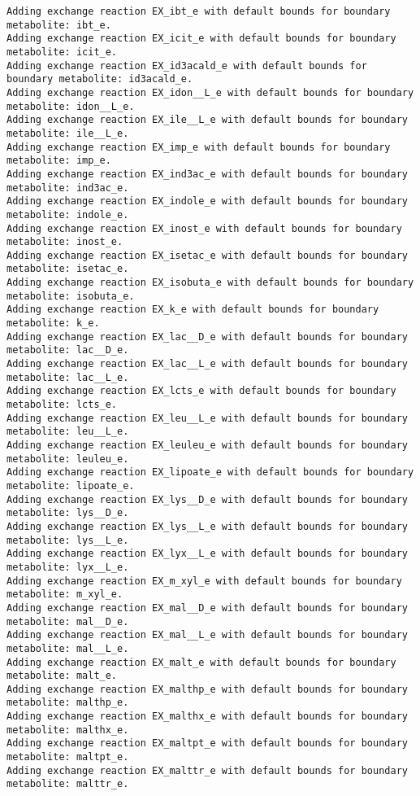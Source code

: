 \documentclass[
  letterpaper,
  DIV=11,
  numbers=noendperiod]{scrartcl}
\begin{document}
\begin{verbatim}
Adding exchange reaction EX_ibt_e with default bounds for boundary metabolite: ibt_e.
Adding exchange reaction EX_icit_e with default bounds for boundary metabolite: icit_e.
Adding exchange reaction EX_id3acald_e with default bounds for boundary metabolite: id3acald_e.
Adding exchange reaction EX_idon__L_e with default bounds for boundary metabolite: idon__L_e.
Adding exchange reaction EX_ile__L_e with default bounds for boundary metabolite: ile__L_e.
Adding exchange reaction EX_imp_e with default bounds for boundary metabolite: imp_e.
Adding exchange reaction EX_ind3ac_e with default bounds for boundary metabolite: ind3ac_e.
Adding exchange reaction EX_indole_e with default bounds for boundary metabolite: indole_e.
Adding exchange reaction EX_inost_e with default bounds for boundary metabolite: inost_e.
Adding exchange reaction EX_isetac_e with default bounds for boundary metabolite: isetac_e.
Adding exchange reaction EX_isobuta_e with default bounds for boundary metabolite: isobuta_e.
Adding exchange reaction EX_k_e with default bounds for boundary metabolite: k_e.
Adding exchange reaction EX_lac__D_e with default bounds for boundary metabolite: lac__D_e.
Adding exchange reaction EX_lac__L_e with default bounds for boundary metabolite: lac__L_e.
Adding exchange reaction EX_lcts_e with default bounds for boundary metabolite: lcts_e.
Adding exchange reaction EX_leu__L_e with default bounds for boundary metabolite: leu__L_e.
Adding exchange reaction EX_leuleu_e with default bounds for boundary metabolite: leuleu_e.
Adding exchange reaction EX_lipoate_e with default bounds for boundary metabolite: lipoate_e.
Adding exchange reaction EX_lys__D_e with default bounds for boundary metabolite: lys__D_e.
Adding exchange reaction EX_lys__L_e with default bounds for boundary metabolite: lys__L_e.
Adding exchange reaction EX_lyx__L_e with default bounds for boundary metabolite: lyx__L_e.
Adding exchange reaction EX_m_xyl_e with default bounds for boundary metabolite: m_xyl_e.
Adding exchange reaction EX_mal__D_e with default bounds for boundary metabolite: mal__D_e.
Adding exchange reaction EX_mal__L_e with default bounds for boundary metabolite: mal__L_e.
Adding exchange reaction EX_malt_e with default bounds for boundary metabolite: malt_e.
Adding exchange reaction EX_malthp_e with default bounds for boundary metabolite: malthp_e.
Adding exchange reaction EX_malthx_e with default bounds for boundary metabolite: malthx_e.
Adding exchange reaction EX_maltpt_e with default bounds for boundary metabolite: maltpt_e.
Adding exchange reaction EX_malttr_e with default bounds for boundary metabolite: malttr_e.

\end{verbatim}
\end{document}
